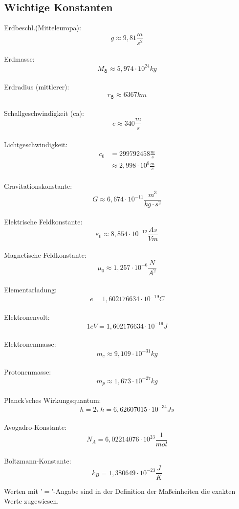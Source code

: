 \documentclass[12pt,a4paper,oneside]{article}
\begin{document}
\subsection*{Wichtige Konstanten}
\begin{multicols}{3}
 Erdbeschl.(Mitteleuropa): $$ g \approx 9,81 \frac{m}{s^2} $$ \\
 Erdmasse: $$ M_{\earth} \approx 5,974 \cdot 10^{24} kg $$ \\
 Erdradius (mittlerer): $$ r_{\earth} \approx 6367 km $$ \\
 Schallgeschwindigkeit (ca): $$ c \approx 340\frac{m}{s} $$ \\
 Lichtgeschwindigkeit:
   \begin{align*} c_0 &= 299 792 458 \frac{m}{s} \\
   &\approx 2,998\cdot 10^8 \frac{m}{s} \end{align*} \\
 Gravitationskonstante: $$ G \approx 6,674\cdot 10^{-11}\frac{m^3}{kg \cdot s^2} $$\\
 Elektrische Feldkonstante: $$ \varepsilon_0 \approx 8,854\cdot 10^{-12}\frac{As}{Vm} $$ \\
 Magnetische Feldkonstante: $$ \mu_0 \approx 1,257\cdot 10^{-6} \frac{N}{A^2} $$ \\
 Elementarladung: $$ e = 1,602 176 634\cdot 10^{-19} C $$ \\
 Elektronenvolt: $$ 1eV = 1,602 176 634\cdot 10^{-19} J $$ \\
 Elektronenmasse: $$ m_e \approx 9,109\cdot 10^{-31} kg $$ \\
 Protonenmasse: $$ m_p \approx 1,673 \cdot 10^{-27} kg $$ \\
 Planck'sches Wirkungsquantum: $$ h = 2\pi\hbar = 6,62607015 \cdot 10^{-34} Js $$ \\
 Avogadro-Konstante: $$ N_A = 6,02214076 \cdot 10^{23} \frac{1}{mol} $$ \\
 Boltzmann-Konstante: $$ k_B = 1,380649\cdot 10^{-23} \frac{J}{K} $$
\end{multicols}

Werten mit '$=$'-Angabe sind in der Definition der Maßeinheiten die exakten Werte zugewiesen.

\end{document}
